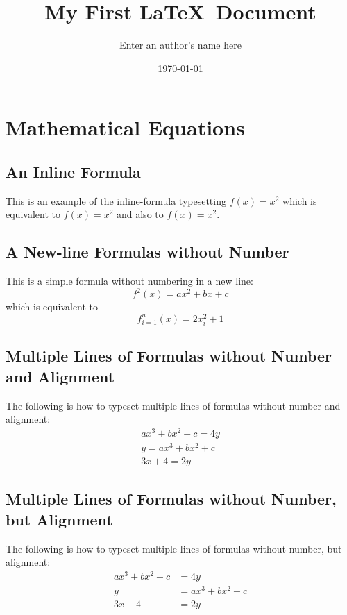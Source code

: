 \documentclass[a4paper, 12pt]{article} %
\title{My First \LaTeX\ Document}
\author{Enter an author’s name here} %
\date{\today}
\begin{document}
	\maketitle
	
	\setcounter{section}{6} %
	\section{Mathematical Equations }
	\subsection{An Inline Formula}
	\noindent
	This is an example of the inline-formula typesetting $f(x) = x^2$ which is equivalent to \(f(x) = x^2\) and also to
	\begin{math}
		f(x) = x^2
	\end{math}.
	
	\subsection{A New-line Formulas without Number}
	This is a simple formula without numbering in a new line:\[f^2(x) = ax^2+bx+c\] which is equivalent to 
	\begin{displaymath} %
		f_{i=1}^{n}(x) = 2x_i^2+1
	\end{displaymath}
	
	\subsection{Multiple Lines of Formulas without Number and Alignment}
	The following is how to typeset multiple lines of formulas without number and alignment:
	\begin{align*} 
		ax^3+bx^2+c = 4y\\
		y = ax^3+bx^2+c \\
		3x+4 = 2y
	\end{align*}

	\subsection{Multiple Lines of Formulas without Number, but Alignment}
	The following is how to typeset multiple lines of formulas without number, but alignment:
	\begin{align*} 
		ax^3+bx^2+c &= 4y\\
		y &= ax^3+bx^2+c \\
		3x+4 &= 2y
	\end{align*}
	
\end{document}
